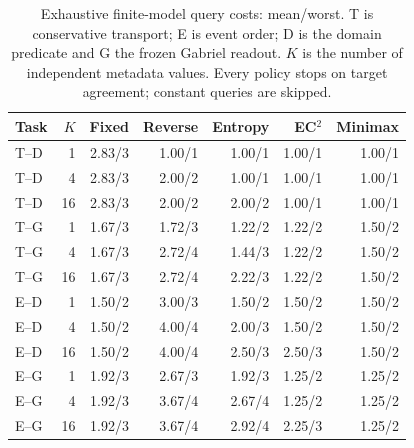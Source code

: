 \begin{table}[htbp]\centering\small
\caption{Exhaustive finite-model query costs: mean/worst. T is conservative transport; E is event order; D is the domain predicate and G the frozen Gabriel readout. $K$ is the number of independent metadata values. Every policy stops on target agreement; constant queries are skipped.}\label{tab:domain}
\begin{tabular}{lrrrrrr}\toprule
Task & $K$ & Fixed & Reverse & Entropy & EC$^2$ & Minimax \\ \midrule
T--D & 1 & 2.83/3 & 1.00/1 & 1.00/1 & 1.00/1 & 1.00/1 \\
T--D & 4 & 2.83/3 & 2.00/2 & 1.00/1 & 1.00/1 & 1.00/1 \\
T--D & 16 & 2.83/3 & 2.00/2 & 2.00/2 & 1.00/1 & 1.00/1 \\
\addlinespace
T--G & 1 & 1.67/3 & 1.72/3 & 1.22/2 & 1.22/2 & 1.50/2 \\
T--G & 4 & 1.67/3 & 2.72/4 & 1.44/3 & 1.22/2 & 1.50/2 \\
T--G & 16 & 1.67/3 & 2.72/4 & 2.22/3 & 1.22/2 & 1.50/2 \\
\addlinespace
E--D & 1 & 1.50/2 & 3.00/3 & 1.50/2 & 1.50/2 & 1.50/2 \\
E--D & 4 & 1.50/2 & 4.00/4 & 2.00/3 & 1.50/2 & 1.50/2 \\
E--D & 16 & 1.50/2 & 4.00/4 & 2.50/3 & 2.50/3 & 1.50/2 \\
\addlinespace
E--G & 1 & 1.92/3 & 2.67/3 & 1.92/3 & 1.25/2 & 1.25/2 \\
E--G & 4 & 1.92/3 & 3.67/4 & 2.67/4 & 1.25/2 & 1.25/2 \\
E--G & 16 & 1.92/3 & 3.67/4 & 2.92/4 & 2.25/3 & 1.25/2 \\
\bottomrule\end{tabular}
\end{table}

